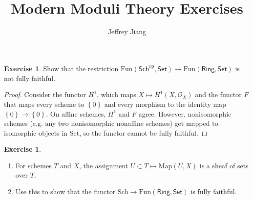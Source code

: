 \documentclass[psamsfonts, 12pt]{amsart}
\theoremstyle{definition}
\newtheorem{exer}[thm]{Exercise}
\theoremstyle{remark}
\renewcommand{\O}{\mathcal{O}}
\newcommand{\set}[1]{\left\lbrace #1 \right\rbrace}
\newcommand{\enumbreak}{\ \\ \vspace{-\baselineskip}}
\begin{document}
%
\author{Jeffrey Jiang}
%
\title{Modern Moduli Theory Exercises}
%
\maketitle
%
\setcounter{section}{1}
%
\setcounter{thm}{1}
%
\begin{exer}
Show that the restriction
$\mathrm{Fun}(\mathsf{Sch}^{\mathrm{op}},\mathsf{Set}) \to
\mathrm{Fun}(\mathsf{Ring},\mathsf{Set})$ is not fully faithful.
\end{exer}
%
\begin{proof}
Consider the functor $H^1$, which maps $X \mapsto H^1(X,\O_X)$ and the functor
$F$ that maps every scheme to $\set{0}$ and every morphism to the identity map
$\set{0} \to \set{0}$. On affine schemes, $H^1$ and $F$ agree. However, nonisomorphic
schemes (e.g. any two nonisomorphic nonaffine schemes) get mapped to isomorphic
objects in $\mathrm{Set}$, so the functor cannot be fully faithful.
\end{proof}
%
\begin{exer} \enumbreak
\begin{enumerate}
  \item For schemes $T$ and $X$, the assignment $U \subset T \mapsto \mathrm{Map}(U,X)$
  is a sheaf of sets over $T$.
  \item Use this to show that the functor
  $\mathrm{Sch}\to\mathrm{Fun}(\mathsf{Ring}, \mathsf{Set})$ is fully faithful.
\end{enumerate}
\end{exer}
%
\end{document}
